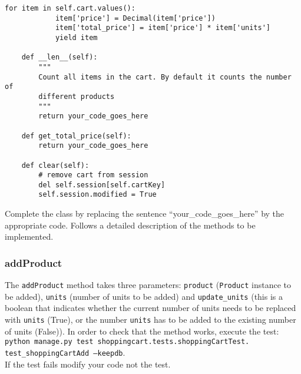 \documentclass[12pt]{article} %
\newcommand{\ttt}[1]{\texttt{#1}}%
\begin{document}
\begin{lstlisting}[caption=template for class \ttt{ShoppingCart},label={lst:cart}]
        for item in self.cart.values():
            item['price'] = Decimal(item['price'])
            item['total_price'] = item['price'] * item['units']
            yield item

    def __len__(self):
        """
        Count all items in the cart. By default it counts the number of 
        different products
        """
        return your_code_goes_here

    def get_total_price(self):
        return your_code_goes_here

    def clear(self):
        # remove cart from session
        del self.session[self.cartKey]
        self.session.modified = True
  \end{lstlisting}

  Complete the class by replacing the sentence ``your\_code\_goes\_here'' by the
  appropriate code. Follows a detailed description of the methods to be implemented.

\subsubsection{addProduct}

The \ttt{addProduct} method takes three parameters: \ttt{product} (\ttt{Product} instance to be added), \ttt{units} (number of units to be added) and \ttt{update\_units} (this is a boolean that indicates whether the current number of units needs to be replaced with \ttt{units} (True), or the number \ttt{units} has to be added to the existing number of units (False)).
In order to check that the method works, execute the test:\\ \ttt{python manage.py test shoppingcart.tests.shoppingCartTest.\\test\_shoppingCartAdd --keepdb}.\\ If the test fails modify your code not the test.
\end{document}
